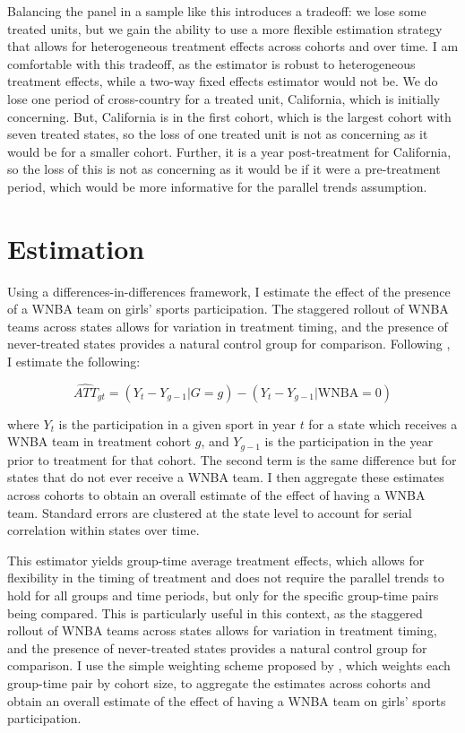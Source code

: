 \documentclass[11pt]{article}
\newcommand{\1}[1]{\mathbb{I}\{#1\}}
\theoremstyle{plain}
\begin{document}
Balancing the panel in a sample like this introduces a tradeoff: we lose some treated units, but we gain the ability to use a more flexible estimation strategy that allows for heterogeneous treatment effects across cohorts and over time. I am comfortable with this tradeoff, as the \cite{csa_2021} estimator is robust to heterogeneous treatment effects, while a two-way fixed effects estimator would not be. We do lose one period of cross-country for a treated unit, California, which is initially concerning. But, California is in the first cohort, which is the largest cohort with seven treated states, so the loss of one treated unit is not as concerning as it would be for a smaller cohort. Further, it is a year post-treatment for California, so the loss of this is not as concerning as it would be if it were a pre-treatment period, which would be more informative for the parallel trends assumption.

\section{Estimation}

Using a differences-in-differences framework, I estimate the effect of the presence of a WNBA team on girls' sports participation. The staggered rollout of WNBA teams across states allows for variation in treatment timing, and the presence of never-treated states provides a natural control group for comparison. Following \cite{csa_2021}, I estimate the following:

\begin{equation}
  \hat{ATT}_{gt} = (Y_t - Y_{g-1}|G=g) - (Y_t - Y_{g-1}|\text{WNBA}=0)
\end{equation}

where \(Y_t\) is the participation in a given sport in year \(t\) for a state which receives a WNBA team in treatment cohort \(g\), and \(Y_{g-1}\) is the participation in the year prior to treatment for that cohort. The second term is the same difference but for states that do not ever receive a WNBA team. I then aggregate these estimates across cohorts to obtain an overall estimate of the effect of having a WNBA team. Standard errors are clustered at the state level to account for serial correlation within states over time.

This estimator yields group-time average treatment effects, which allows for flexibility in the timing of treatment and does not require the parallel trends to hold for all groups and time periods, but only for the specific group-time pairs being compared. This is particularly useful in this context, as the staggered rollout of WNBA teams across states allows for variation in treatment timing, and the presence of never-treated states provides a natural control group for comparison. I use the simple weighting scheme proposed by \cite{csa_2021}, which weights each group-time pair by cohort size, to aggregate the estimates across cohorts and obtain an overall estimate of the effect of having a WNBA team on girls' sports participation.
\end{document}
